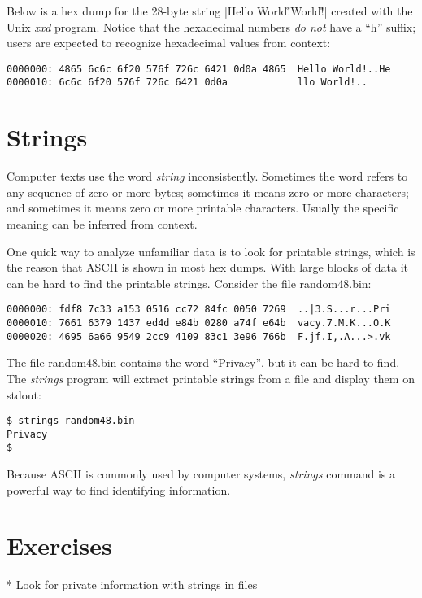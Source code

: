 \documentclass[11pt,letter]{book}
\begin{document}
Below is a hex dump for the 28-byte string 
|Hello World!\r\nHello World!\r\n| created with the Unix \emph{xxd}
program. Notice that the hexadecimal numbers \emph{do not} have a
``h'' suffix; users are expected to recognize hexadecimal values from
context:

\begin{Verbatim}
0000000: 4865 6c6c 6f20 576f 726c 6421 0d0a 4865  Hello World!..He
0000010: 6c6c 6f20 576f 726c 6421 0d0a            llo World!..
\end{Verbatim}


\section{Strings}\label{sec:strings}

Computer texts use the word \emph{string} inconsistently. Sometimes
the word refers to any sequence of zero or more bytes; sometimes it
means zero or more characters; and sometimes it means zero or
more printable characters. Usually the specific meaning can be
inferred from context. 

One quick way to analyze unfamiliar data is to look for printable
strings, which is the reason that ASCII is shown in most hex
dumps. With large blocks of data it can be hard to find the printable
strings. Consider the file random48.bin:

\begin{Verbatim}
0000000: fdf8 7c33 a153 0516 cc72 84fc 0050 7269  ..|3.S...r...Pri
0000010: 7661 6379 1437 ed4d e84b 0280 a74f e64b  vacy.7.M.K...O.K
0000020: 4695 6a66 9549 2cc9 4109 83c1 3e96 766b  F.jf.I,.A...>.vk
\end{Verbatim}

The file random48.bin contains the word ``Privacy'', but it can be hard to
find. The \emph{strings} program will extract printable
strings from a file and display them on stdout:

\begin{Verbatim}
$ strings random48.bin 
Privacy
$ 
\end{Verbatim}

Because ASCII is commonly used by computer systems, 
\emph{strings} command is a powerful way to find  identifying
information. 

\section{Exercises}
* Look for private information with strings in files
\end{document}
